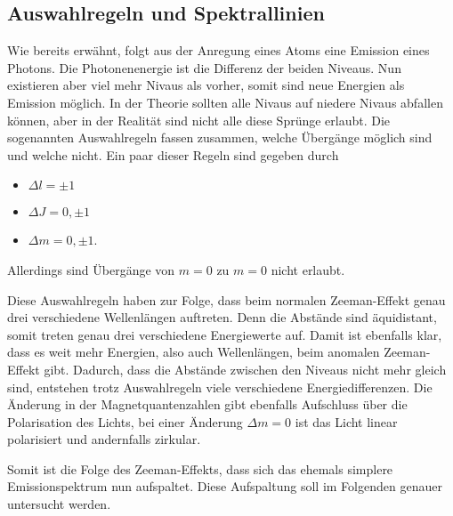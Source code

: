 \subsection{Auswahlregeln und Spektrallinien}
\label{ssec:theo5}

Wie bereits erwähnt, folgt aus der Anregung eines Atoms eine Emission eines Photons.
Die Photonenenergie ist die Differenz der beiden Niveaus.
Nun existieren aber viel mehr Nivaus als vorher, somit sind neue Energien als Emission möglich. 
In der Theorie sollten alle Nivaus auf niedere Nivaus abfallen können, aber in der Realität sind nicht alle diese Sprünge erlaubt.
Die sogenannten Auswahlregeln fassen zusammen, welche Übergänge möglich sind und welche nicht.
Ein paar dieser Regeln sind gegeben durch
\begin{itemize} 
    \item $\Delta l = \pm 1$
    \item $\Delta J = 0, \pm 1$
    \item $\Delta m = 0, \pm 1$.
\end{itemize}
Allerdings sind Übergänge von $m = 0$ zu $m = 0$ nicht erlaubt.

Diese Auswahlregeln haben zur Folge, dass beim normalen Zeeman-Effekt genau drei verschiedene Wellenlängen auftreten. 
Denn die Abstände sind äquidistant, somit treten genau drei verschiedene Energiewerte auf.
Damit ist ebenfalls klar, dass es weit mehr Energien, also auch Wellenlängen, beim anomalen Zeeman-Effekt gibt.
Dadurch, dass die Abstände zwischen den Niveaus nicht mehr gleich sind, entstehen trotz Auswahlregeln viele verschiedene Energiedifferenzen.
Die Änderung in der Magnetquantenzahlen gibt ebenfalls Aufschluss über die Polarisation des Lichts, bei einer Änderung $\Delta m = 0$ ist das Licht linear polarisiert und andernfalls zirkular.

Somit ist die Folge des Zeeman-Effekts, dass sich das ehemals simplere Emissionspektrum nun aufspaltet.
Diese Aufspaltung soll im Folgenden genauer untersucht werden. 

